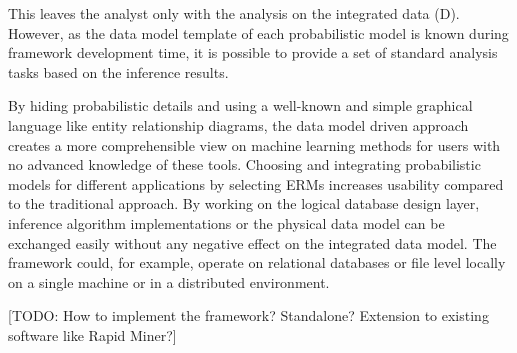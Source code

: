 This leaves the analyst only with the analysis on the integrated data (D). However, as the data model template of each probabilistic model is known during framework development time, it is possible to provide a set of standard analysis tasks based on the inference results.

By hiding probabilistic details and using a well-known and simple graphical language like entity relationship diagrams, the data model driven approach creates a more comprehensible view on machine learning methods for users with no advanced knowledge of these tools. Choosing and integrating probabilistic models for different applications by selecting ERMs increases usability compared to the traditional approach. By working on the logical database design layer, inference algorithm implementations or the physical data model can be exchanged easily without any negative effect on the integrated data model. The framework could, for example, operate on relational databases or file level locally on a single machine or in a distributed environment.

[TODO: How to implement the framework? Standalone? Extension to existing software like Rapid Miner?]
